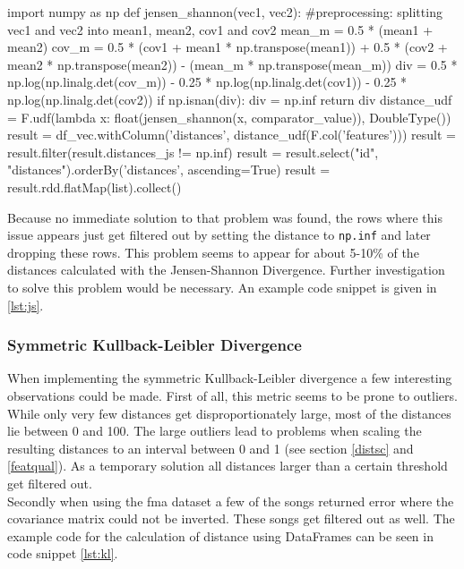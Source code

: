 \begin{pythonCode}[frame=single,label={lst:js},caption={Jensen-Shannon-like Divergence},captionpos=b]
import numpy as np
def jensen_shannon(vec1, vec2):
	#preprocessing: splitting vec1 and vec2 into mean1, mean2, cov1 and cov2
	mean_m = 0.5 * (mean1 + mean2)
	cov_m = 0.5 * (cov1 + mean1 * np.transpose(mean1)) + 0.5 * 
		(cov2 + mean2 * np.transpose(mean2)) - (mean_m * np.transpose(mean_m))
	div = 0.5 * np.log(np.linalg.det(cov_m)) - 0.25 * np.log(np.linalg.det(cov1)) - 
		0.25 * np.log(np.linalg.det(cov2))  
	if np.isnan(div):
		div = np.inf
	return div
distance_udf = F.udf(lambda x: float(jensen_shannon(x, comparator_value)), 
	DoubleType())
result = df_vec.withColumn('distances', distance_udf(F.col('features')))
result = result.filter(result.distances_js != np.inf)    
result = result.select("id", "distances").orderBy('distances', ascending=True)
result = result.rdd.flatMap(list).collect()
\end{pythonCode}

\noindent Because no immediate solution to that problem was found, the rows where this issue appears just get filtered out by setting the distance to \lstinline{np.inf} and later dropping these rows. This problem seems to appear for about 5-10\% of the distances calculated with the Jensen-Shannon Divergence. Further investigation to solve this problem would be necessary. 
An example code snippet is given in \ref{lst:js}.

\subsubsection{Symmetric Kullback-Leibler Divergence}\label{sparkskl}

When implementing the symmetric Kullback-Leibler divergence a few interesting observations could be made. First of all, this metric seems to be prone to outliers. While only very few distances get disproportionately large, most of the distances lie between 0 and 100. The large outliers lead to problems when scaling the resulting distances to an interval between 0 and 1 (see section \ref{distsc} and \ref{featqual}). As a temporary solution all distances larger than a certain threshold get filtered out.\\ 
Secondly when using the fma dataset a few of the songs returned error where the covariance matrix could not be inverted. 
These songs get filtered out as well. The example code for the calculation of distance using DataFrames can be seen in code snippet \ref{lst:kl}. 

